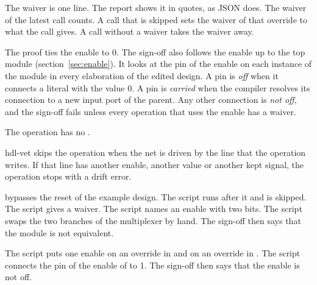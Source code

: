 \begin{entry}{}
  The waiver is one line. The report shows it in quotes, as JSON does. The waiver of the
  latest call counts. A call that is skipped sets the waiver of that
  override to what the call gives. A call without a waiver takes the waiver away.
\item[The way of the enable] The proof ties the enable to 0. The sign-off also follows the
  enable up to the top module (section~\ref{sec:enable}). It looks at the pin of the enable
  on each instance of the module in every elaboration of the edited design. A pin is
  \emph{off} when it connects a literal with the value 0. A pin is \emph{carried} when the
  compiler resolves its connection to a new input port of the parent. Any other connection is \emph{not off}, and the sign-off fails unless every
  operation that uses the enable has a waiver.
\item[was] The operation has no .
\item[Again] hdl-vet skips the operation when the net is driven by the line
   that the operation writes. If that line has
  another enable, another value or another kept signal, the operation stops with a drift
  error.
\item[Example]  bypasses the reset of the example design. The script
   runs after it and is skipped. The script
   gives a waiver. The script  names an
  enable with two bits. The script  swaps the two branches of the
  multiplexer by hand. The sign-off then says that the module is not equivalent.

  The script  puts one enable on an override in  and
  on an override in . The script  connects the pin of
  the enable of  to 1. The sign-off then says that the enable is not off.
\end{entry}











